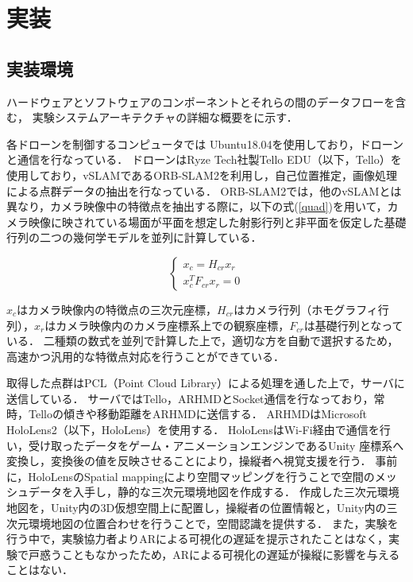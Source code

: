 \documentclass[a4paper,11pt]{ujreport}
\begin{document}
\chapter{実装}
\label{chap:Development}


\section{実装環境}
\label{sec:DevEnviroment}

ハードウェアとソフトウェアのコンポーネントとそれらの間のデータフローを含む，
実験システムアーキテクチャの詳細な概要をに示す．

各ドローンを制御するコンピュータでは Ubuntu18.04を使用しており，ドローンと通信を行なっている．
ドローンはRyze Tech社製Tello EDU（以下，Tello）\cite{web-tello}を使用しており，vSLAMであるORB-SLAM2\cite{article-slam}を利用し，自己位置推定，画像処理による点群データの抽出を行なっている．
ORB-SLAM2では，他のvSLAMとは異なり，カメラ映像中の特徴点を抽出する際に，以下の式(\ref{quad})を用いて，カメラ映像に映されている場面が平面を想定した射影行列と非平面を仮定した基礎行列の二つの幾何学モデルを並列に計算している．

\begin{equation}
  \label{quad}
  \left\{
    \begin{aligned}
    x_{c}=H_{cr}x_{r}\\
    x^{T}_{c}F_{cr}x_{r}=0
  \end{aligned}
  \right.
\end{equation}

$x_{c}$はカメラ映像内の特徴点の三次元座標，$H_{cr}$はカメラ行列（ホモグラフィ行列），$x_{r}$はカメラ映像内のカメラ座標系上での観察座標，$F_{cr}$は基礎行列となっている．
二種類の数式を並列で計算した上で，適切な方を自動で選択するため，高速かつ汎用的な特徴点対応を行うことができている．

取得した点群はPCL（Point Cloud Library）\cite{book-pcl}による処理を通した上で，サーバに送信している．
サーバではTello，ARHMDとSocket通信を行なっており，常時，Telloの傾きや移動距離をARHMDに送信する．
ARHMDはMicrosoft HoloLens2（以下，HoloLens）\cite{web-hololens}を使用する．
HoloLensはWi-Fi経由で通信を行い，受け取ったデータをゲーム・アニメーションエンジンであるUnity \cite{web-unity}座標系へ変換し，変換後の値を反映させることにより，操縦者へ視覚支援を行う．
事前に，HoloLensのSpatial mapping\cite{web-spatial}により空間マッピングを行うことで空間のメッシュデータを入手し，静的な三次元環境地図を作成する．
作成した三次元環境地図を，Unity内の3D仮想空間上に配置し，操縦者の位置情報と，Unity内の三次元環境地図の位置合わせを行うことで，空間認識を提供する．
また，実験を行う中で，実験協力者よりARによる可視化の遅延を提示されたことはなく，実験で戸惑うこともなかったため，ARによる可視化の遅延が操縦に影響を与えることはない．
\end{document}
